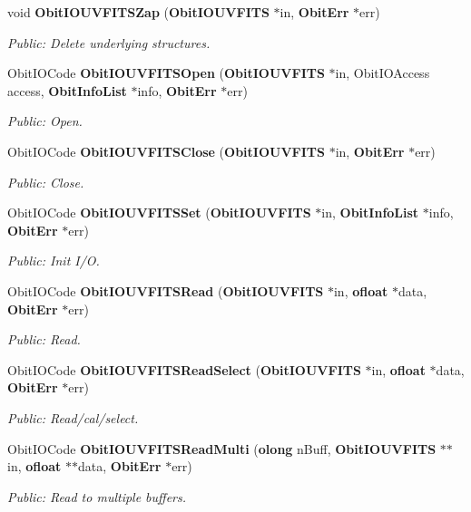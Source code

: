 \begin{CompactItemize}
void {\bf Obit\-IOUVFITSZap} ({\bf Obit\-IOUVFITS} $\ast$in, {\bf Obit\-Err} $\ast$err)
\begin{CompactList}\small\item\em Public: Delete underlying structures. \item\end{CompactList}\item 
Obit\-IOCode {\bf Obit\-IOUVFITSOpen} ({\bf Obit\-IOUVFITS} $\ast$in, Obit\-IOAccess access, {\bf Obit\-Info\-List} $\ast$info, {\bf Obit\-Err} $\ast$err)
\begin{CompactList}\small\item\em Public: Open. \item\end{CompactList}\item 
Obit\-IOCode {\bf Obit\-IOUVFITSClose} ({\bf Obit\-IOUVFITS} $\ast$in, {\bf Obit\-Err} $\ast$err)
\begin{CompactList}\small\item\em Public: Close. \item\end{CompactList}\item 
Obit\-IOCode {\bf Obit\-IOUVFITSSet} ({\bf Obit\-IOUVFITS} $\ast$in, {\bf Obit\-Info\-List} $\ast$info, {\bf Obit\-Err} $\ast$err)
\begin{CompactList}\small\item\em Public: Init I/O. \item\end{CompactList}\item 
Obit\-IOCode {\bf Obit\-IOUVFITSRead} ({\bf Obit\-IOUVFITS} $\ast$in, {\bf ofloat} $\ast$data, {\bf Obit\-Err} $\ast$err)
\begin{CompactList}\small\item\em Public: Read. \item\end{CompactList}\item 
Obit\-IOCode {\bf Obit\-IOUVFITSRead\-Select} ({\bf Obit\-IOUVFITS} $\ast$in, {\bf ofloat} $\ast$data, {\bf Obit\-Err} $\ast$err)
\begin{CompactList}\small\item\em Public: Read/cal/select. \item\end{CompactList}\item 
Obit\-IOCode {\bf Obit\-IOUVFITSRead\-Multi} ({\bf olong} n\-Buff, {\bf Obit\-IOUVFITS} $\ast$$\ast$in, {\bf ofloat} $\ast$$\ast$data, {\bf Obit\-Err} $\ast$err)
\begin{CompactList}\small\item\em Public: Read to multiple buffers. \item\end{CompactList}\item 

\end{CompactItemize}
